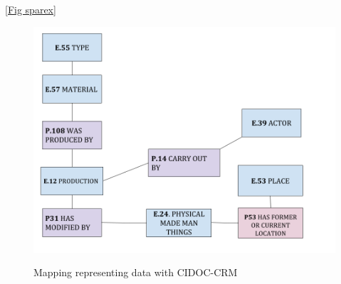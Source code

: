 \documentclass[10pt,a4paper]{article}
\begin{document}
 \ref{Fig sparex}

\begin{figure}[hdp]
\centering
\includegraphics[scale=0.50]{sparex.png}
\label{sparex}
\caption{Mapping representing data with CIDOC-CRM}
\end{figure}



































 
\end{document}

